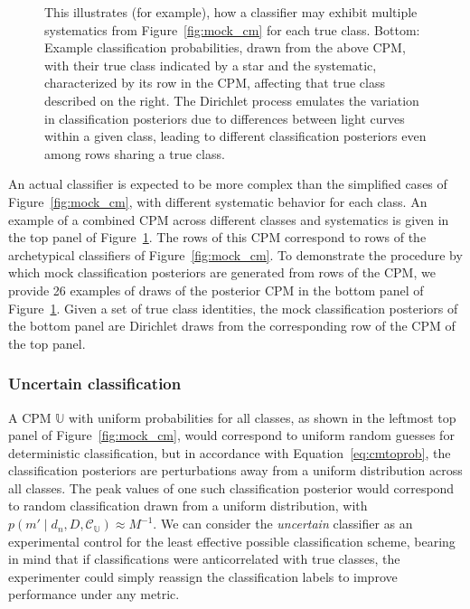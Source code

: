 \begin{figure}
\begin{center}
{		This illustrates (for example), how a classifier may exhibit multiple systematics from Figure~\ref{fig:mock_cm} for each true class.
		Bottom: Example classification probabilities, drawn from the above CPM, with their true class indicated by a star and the systematic, characterized by its row in the CPM, affecting that true class described on the right.
		The Dirichlet process emulates the variation in classification posteriors due to differences between light curves within a given class, leading to different classification posteriors even among rows sharing a true class.
		}
		\label{fig:mock_probs}
	\end{center}
\end{figure}

An actual classifier is expected to be more complex than the simplified cases of Figure~\ref{fig:mock_cm}, with different systematic behavior for each class.
An example of a combined CPM across different classes and systematics is given in the top panel of Figure~\ref{fig:mock_probs}.
The rows of this CPM correspond to rows of the archetypical classifiers of Figure~\ref{fig:mock_cm}.
To demonstrate the procedure by which mock classification posteriors are generated from rows of the CPM, we provide 26 examples of draws of the posterior CPM in the bottom panel of Figure~\ref{fig:mock_probs}.
Given a set of true class identities, the mock classification posteriors of the bottom panel are Dirichlet draws from the corresponding row of the CPM of the top panel.

\subsubsection{Uncertain classification}
\label{sec:uncertaindata}

A CPM $\mathbb{U}$ with uniform probabilities for all classes, as shown in the leftmost top panel of Figure~\ref{fig:mock_cm}, would correspond to uniform random guesses for deterministic classification, but in accordance with Equation~\ref{eq:cmtoprob}, the classification posteriors are perturbations away from a uniform distribution across all classes.
The peak values of one such classification posterior would correspond to random classification drawn from a uniform distribution, with $p(m' \mid d_{n}, D, \mathcal{C}_{\mathbb{U}}) \approx M^{-1}$.
We can consider the \textit{uncertain} classifier as an experimental control for the least effective possible classification scheme, bearing in mind that if classifications were anticorrelated with true classes, the experimenter could simply reassign the classification labels to improve performance under any metric.

